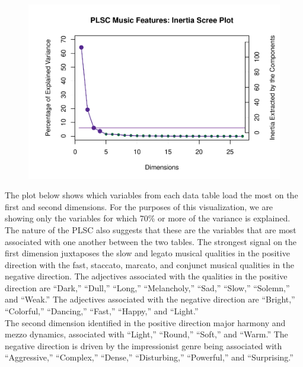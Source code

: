 \documentclass[
  english,
  man,floatsintext]{apa6}
\begin{document}
\begin{figure}

{\centering \includegraphics{Music-Descriptor-Space_files/figure-latex/screePLSC-1} 

}

\caption{ }\label{fig:screePLSC}
\end{figure}

The plot below shows which variables from each data table load the most on the first and second dimensions. For the purposes of this visualization, we are showing only the variables for which 70\% or more of the variance is explained. The nature of the PLSC also suggests that these are the variables that are most associated with one another between the two tables. The strongest signal on the first dimension juxtaposes the slow and legato musical qualities in the positive direction with the fast, staccato, marcato, and conjunct musical qualities in the negative direction. The adjectives associated with the qualities in the positive direction are ``Dark,'' ``Dull,'' ``Long,'' ``Melancholy,'' ``Sad,'' ``Slow,'' ``Solemn,'' and ``Weak.'' The adjectives associated with the negative direction are ``Bright,'' ``Colorful,'' ``Dancing,'' ``Fast,'' ``Happy,'' and ``Light.''\\
The second dimension identified in the positive direction major harmony and mezzo dynamics, associated with ``Light,'' ``Round,'' ``Soft,'' and ``Warm.'' The negative direction is driven by the impressionist genre being associated with ``Aggressive,'' ``Complex,'' ``Dense,'' ``Disturbing,'' ``Powerful,'' and ``Surprising.''
\end{document}
